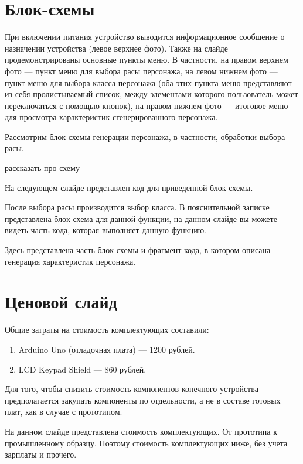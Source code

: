 \documentclass[12pt,a4paper]{article}
\begin{document}
\section{Блок-схемы}

При включении питания устройство выводится информационное сообщение о назначении устройства (левое верхнее фото). Также на слайде продемонстрированы основные пункты меню. В частности, на правом верхнем фото --- пункт меню для выбора расы персонажа, на левом нижнем фото --- пункт меню для выбора класса персонажа (оба этих пункта меню представляют из себя пролистываемый список, между элементами которого пользователь может переключаться с помощью кнопок), на правом нижнем фото --- итоговое меню для просмотра характеристик сгенерированного персонажа.

Рассмотрим блок-схемы генерации персонажа, в частности, обработки выбора расы.

рассказать про схему

На следующем слайде представлен код для приведенной блок-схемы.

После выбора расы производится выбор класса. В пояснительной записке представлена блок-схема для данной функции, на данном слайде вы можете видеть часть кода, которая выполняет данную функцию.


Здесь представлена часть блок-схемы и фрагмент кода, в котором описана генерация характеристик персонажа.

\section{Ценовой слайд}

Общие затраты на стоимость комплектующих составили:

\begin{enumerate}
    \item Arduino Uno (отладочная плата) --- 1200 рублей.
    \item LCD Keypad Shield --- 860 рублей.
\end{enumerate}

Для того, чтобы снизить стоимость компонентов конечного устройства предполагается закупать компоненты по отдельности, а не в составе готовых плат, как в случае с прототипом.

На данном слайде представлена стоимость комплектующих. От прототипа к промышленному образцу. Поэтому стоимость комплектующих ниже, без учета зарплаты и прочего.
\end{document}
